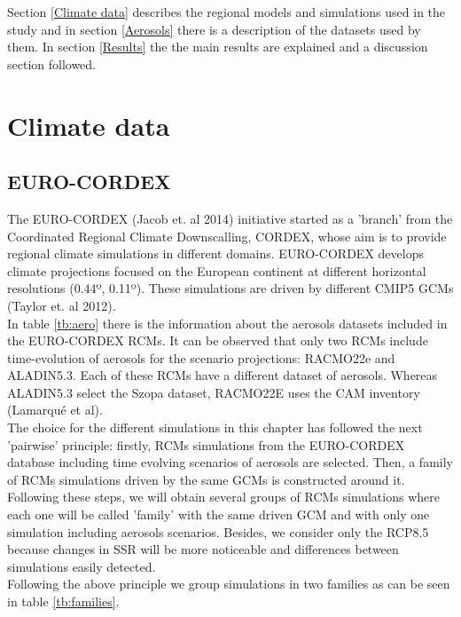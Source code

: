    Section \ref{Climate data} describes the regional models and simulations used in the study and in section \ref{Aerosols} there is a description of the datasets used by them.  In section \ref{Results} the the main results are explained and a discussion section followed.\\

\section{Climate data}

\subsection{EURO-CORDEX}

The EURO-CORDEX (Jacob et. al 2014) initiative started as a 'branch' from the Coordinated Regional Climate Downscalling, CORDEX, whose aim is to provide regional climate simulations in different domains. EURO-CORDEX develops climate projections focused on the European continent at different horizontal resolutions (0.44º, 0.11º). These simulations are driven by different CMIP5 GCMs (Taylor et. al 2012).\\

In table \ref{tb:aero} there is the information about the aerosols datasets included in the EURO-CORDEX RCMs. It can be observed that only two RCMs include time-evolution of aerosols for the scenario projections: RACMO22e and ALADIN5.3. Each of these RCMs have a different dataset of aerosols. Whereas ALADIN5.3 select the Szopa dataset, RACMO22E uses the CAM inventory (Lamarqué et al).\\ 

The choice for the different simulations in this chapter has followed the next 'pairwise' principle: firstly, RCMs simulations from the EURO-CORDEX database including time evolving scenarios of aerosols are selected. Then, a family of RCMs simulations driven by the same GCMs is constructed around it. Following these steps, we will obtain several groups of RCMs simulations where each one will be called 'family' with the same driven GCM and with only one simulation including aerosols scenarios. Besides, we consider only the RCP8.5 because changes in SSR will be more noticeable and differences between simulations easily detected.\\ 

Following the above principle we group simulations in two families as can be seen in table \ref{tb:families}.

